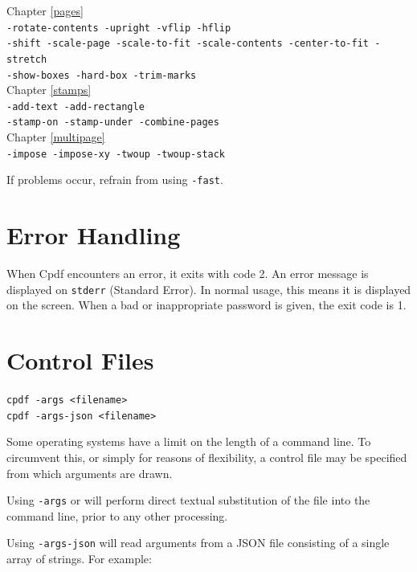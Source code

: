 \documentclass{book}
\begin{document}
\begin{framed}
\small\noindent Chapter \ref{pages}\\
\noindent\small\verb!-rotate-contents -upright -vflip -hflip!\\
\small\verb!-shift -scale-page -scale-to-fit -scale-contents -center-to-fit -stretch!\\
\small\verb!-show-boxes -hard-box -trim-marks!\\

\noindent Chapter \ref{stamps}\\
\noindent\small\verb!-add-text -add-rectangle!\\
\small\verb!-stamp-on -stamp-under -combine-pages!\\

\noindent Chapter \ref{multipage}\\
\noindent\verb!-impose -impose-xy -twoup -twoup-stack!
\end{framed}

\noindent If problems occur, refrain from using \verb!-fast!.

\section{Error Handling}
When Cpdf encounters an error, it exits with code 2. An error message is
displayed on \texttt{stderr} (Standard Error). In normal usage, this means it is
displayed on the screen. When a bad or inappropriate password is given, the exit code is 1.

\section{Control Files}
\begin{framed}
  \noindent\small\verb!cpdf -args <filename>!\\
  \noindent\small\verb!cpdf -args-json <filename>!
\end{framed}

Some operating systems have a limit on the length of a command line. To
circumvent this, or simply for reasons of flexibility, a control file may be
specified from which arguments are drawn.

Using \texttt{-args} or will perform direct textual substitution of the file into the command line, prior to any other processing.

Using \texttt{-args-json} will read arguments from a JSON file consisting of a single array of strings. For example:
\end{document}
